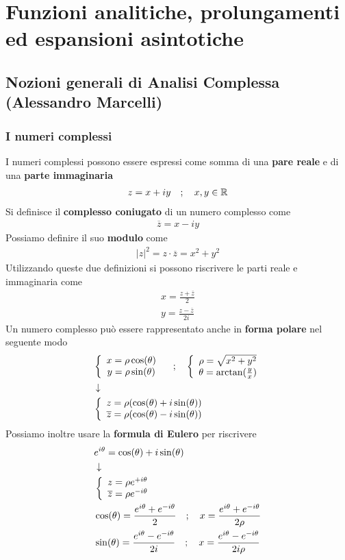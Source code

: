 \chapter{Funzioni analitiche, prolungamenti ed espansioni asintotiche}

\section{Nozioni generali di Analisi Complessa (Alessandro Marcelli)}

\subsection{I numeri complessi}

I numeri complessi possono essere espressi come somma di una \textbf{pare reale} e di una \textbf{parte immaginaria}
\begin{align}
	z = x + iy \quad ; \quad x,y \in \mathbb{R}
\end{align}
Si definisce il \textbf{complesso coniugato} di un numero complesso come
\begin{align}
	\overline{z} = x-iy
\end{align}
Possiamo definire il suo \textbf{modulo} come
\begin{align}
	|z|^2 = z \cdot \overline{z} = x^2 + y^2
\end{align}
Utilizzando queste due definizioni si possono riscrivere le parti reale e immaginaria come
\begin{align}
	x = \frac{z+ \overline{z}}{2}\\
	y = \frac{z- \overline{z}}{2i}
\end{align}
Un numero complesso può essere rappresentato anche in \textbf{forma polare} nel seguente modo
\begin{align}
	&\left\{ \begin{array}{cc} x = \rho \cos (\theta)\\ y = \rho \sin (\theta) \end{array} \right. \quad ; \quad \left\{ \begin{array}{cc} \rho = \sqrt{x^2 + y^2}\\ \theta = \arctan (\frac{y}{x}) \end{array} \right.\\ &\downarrow \nonumber \\
	&\left\{ \begin{array}{cc} z =  \rho (\cos (\theta) + i\sin(\theta))\\ \overline{z} = \rho (\cos (\theta) - i\sin(\theta)) \end{array} \right.
\end{align}
Possiamo inoltre usare la \textbf{formula di Eulero} per riscrivere
\begin{align}
	&e^{i\theta} = \cos(\theta)+ i \sin (\theta)\\ &\downarrow \nonumber \\
	&\left\{ \begin{array}{cc} z = \rho e^{+i\theta}\\ \overline{z} = \rho e^{-i\theta} \end{array} \right.\\
	&\cos (\theta) = \frac{e^{i\theta} + e^{-i\theta}}{2} \quad ; \quad x= \frac{e^{i\theta} + e^{-i\theta}}{2\rho}\\
	&\sin (\theta) = \frac{e^{i\theta} - e^{-i\theta}}{2i} \quad ; \quad x= \frac{e^{i\theta} - e^{-i\theta}}{2i\rho}
\end{align}

